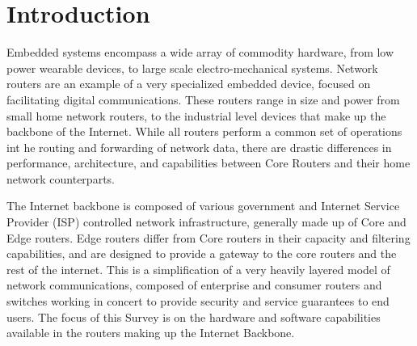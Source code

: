 \section{Introduction}
Embedded systems encompass a wide array of commodity hardware, from low power wearable devices, to large scale electro-mechanical systems. Network routers are an example of a very specialized embedded device, focused on facilitating digital communications. These routers range in size and power from small home network routers, to the industrial level devices that make up the backbone of the Internet. While all routers perform a common set of operations int he routing and forwarding of network data, there are drastic differences in performance, architecture, and capabilities between Core Routers and their home network counterparts.

The Internet backbone is composed of various government and Internet Service Provider (ISP) controlled network infrastructure, generally made up of Core and Edge routers. Edge routers differ from Core routers in their capacity and filtering capabilities, and are designed to provide a gateway to the core routers and the rest of the internet. This is a simplification of a very heavily layered model of network communications, composed of enterprise and consumer routers and switches working in concert to provide security and service guarantees to end users. The focus of this Survey is on the hardware and software capabilities available in the routers making up the Internet Backbone.


